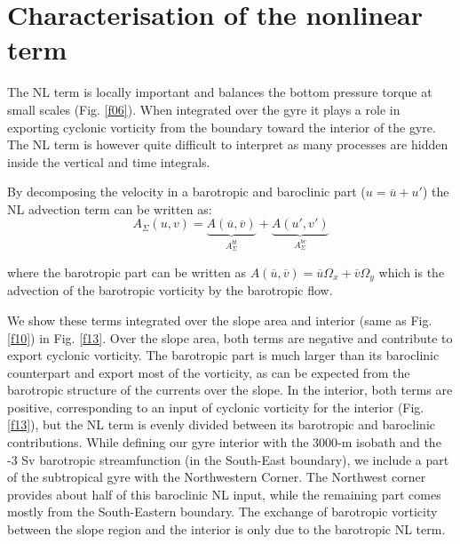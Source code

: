 \documentclass[os, manuscript]{copernicus}
\begin{document}
\section{Characterisation of the nonlinear term}

The NL term is locally important and balances the bottom pressure torque at small scales (Fig. \ref{f06}). When integrated over the gyre it plays a role in exporting cyclonic vorticity from the boundary toward the interior of the gyre. The NL term is however quite difficult to interpret as  many processes are hidden inside the vertical and time integrals. 

By decomposing the velocity in a barotropic and baroclinic part ($u = \overline{u} + u'$) the NL advection term can be written as:
\begin{equation}
A_{\Sigma}(u,v)=\underbrace{A(\overline{u},\overline{v})}_{A^{bt}_{\Sigma}}+\underbrace{A(u',v')}_{A^{bc}_{\Sigma}}
\end{equation}

where the barotropic part can be written as $A(\overline{u},\overline{v})= \overline{u}\Omega _x +\overline{v}\Omega _y$ which is the advection of the barotropic vorticity by the barotropic flow.  

We show these terms integrated over the slope area and interior (same as Fig. \ref{f10}) in Fig. \ref{f13}. Over the slope area, both terms are negative and contribute to export cyclonic vorticity. The barotropic part is much larger than its baroclinic counterpart and export most of the vorticity, as can be expected from the barotropic structure of the currents over the slope. In the interior, both terms are positive, corresponding to an input of cyclonic vorticity for the interior (Fig. \ref{f13}), but the NL term is evenly divided between its barotropic and baroclinic contributions. While defining our gyre interior with the 3000-m isobath and the -3 Sv barotropic streamfunction (in the South-East boundary), we include a part of the subtropical gyre with the Northwestern Corner. The Northwest corner provides about half of this baroclinic NL input, while the remaining part comes mostly from the South-Eastern boundary. The exchange of barotropic vorticity between the slope region and the interior is only due to the barotropic NL term.
\end{document}

